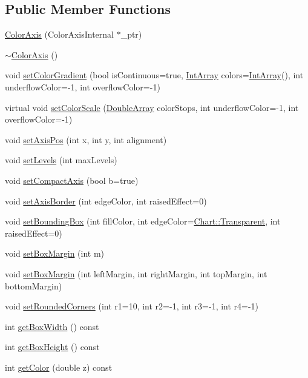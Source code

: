\subsection*{Public Member Functions}
\begin{DoxyCompactItemize}
\item 
\hyperlink{class_color_axis_ab0eedd68ce592921fec66c44be262a94}{Color\+Axis} (Color\+Axis\+Internal $\ast$\+\_\+ptr)
\item 
\hyperlink{class_color_axis_a532bc8d05b8a461eaba37f505d79b5ac}{$\sim$\+Color\+Axis} ()
\item 
void \hyperlink{class_color_axis_ad714f882d231d7ab080f6f8cf100e9a9}{set\+Color\+Gradient} (bool is\+Continuous=true, \hyperlink{class_int_array}{Int\+Array} colors=\hyperlink{class_int_array}{Int\+Array}(), int underflow\+Color=-\/1, int overflow\+Color=-\/1)
\item 
virtual void \hyperlink{class_color_axis_a6b69eab76fa6cecf721ef1bcec32a817}{set\+Color\+Scale} (\hyperlink{class_double_array}{Double\+Array} color\+Stops, int underflow\+Color=-\/1, int overflow\+Color=-\/1)
\item 
void \hyperlink{class_color_axis_aa1864826f904e5cdf34ecaaba55647a0}{set\+Axis\+Pos} (int x, int y, int alignment)
\item 
void \hyperlink{class_color_axis_af9791e5ea41aa81191e6b88876f35348}{set\+Levels} (int max\+Levels)
\item 
void \hyperlink{class_color_axis_a5a1797dffe8ef43447a920cd50e6c7d4}{set\+Compact\+Axis} (bool b=true)
\item 
void \hyperlink{class_color_axis_a0b1903f8220e8ba4523e887d79cc0f74}{set\+Axis\+Border} (int edge\+Color, int raised\+Effect=0)
\item 
void \hyperlink{class_color_axis_aa84a71cabd3bb3b6415fe6e94b7ba5eb}{set\+Bounding\+Box} (int fill\+Color, int edge\+Color=\hyperlink{namespace_chart_abee0d882fdc9ad0b001245ad9fc64011afc6811800a9e2582dac0157b6279f836}{Chart\+::\+Transparent}, int raised\+Effect=0)
\item 
void \hyperlink{class_color_axis_ad60effdecee5281b5f6ddbfdd234afa8}{set\+Box\+Margin} (int m)
\item 
void \hyperlink{class_color_axis_a803f0b7b216c5095767afd61dcb62141}{set\+Box\+Margin} (int left\+Margin, int right\+Margin, int top\+Margin, int bottom\+Margin)
\item 
void \hyperlink{class_color_axis_a0bcbd3e8e36d3997f393261bf5432fcb}{set\+Rounded\+Corners} (int r1=10, int r2=-\/1, int r3=-\/1, int r4=-\/1)
\item 
int \hyperlink{class_color_axis_a72496a3139183a40c1eb75d77b63a437}{get\+Box\+Width} () const
\item 
int \hyperlink{class_color_axis_a247cf31201720a7ef116f86a087ffa93}{get\+Box\+Height} () const
\item 
int \hyperlink{class_color_axis_a8531ba9a751d70e4228ba06f6449433f}{get\+Color} (double z) const
\end{DoxyCompactItemize}
